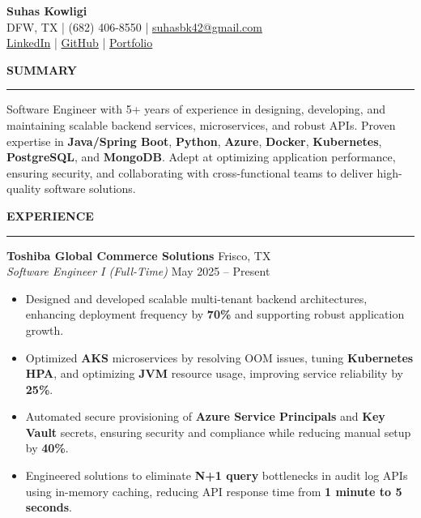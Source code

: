 \documentclass[10pt]{article}
\newcommand{\sectionTitle}[1]{\vspace{1pt}\noindent\textbf{\small #1}\vspace{0.5pt}\hrule\vspace{1pt}}
\begin{document}
\small

\begin{center}
    {\large \textbf{Suhas Kowligi}}\\
    DFW, TX \;|\; (682) 406-8550 \;|\; \href{mailto:suhasbk42@gmail.com}{suhasbk42@gmail.com}\\
    \href{https://www.linkedin.com/in/suhas-kowligi-b39a9415a}{LinkedIn} \;|\;
    \href{https://github.com/SuhasBk}{GitHub} \;|\;
    \href{https://suhasbk.github.io}{Portfolio}
\end{center}

\sectionTitle{SUMMARY}

Software Engineer with 5+ years of experience in designing, developing, and maintaining scalable backend services, microservices, and robust APIs. Proven expertise in \textbf{Java/Spring Boot}, \textbf{Python}, \textbf{Azure}, \textbf{Docker}, \textbf{Kubernetes}, \textbf{PostgreSQL}, and \textbf{MongoDB}. Adept at optimizing application performance, ensuring security, and collaborating with cross-functional teams to deliver high-quality software solutions.

\sectionTitle{EXPERIENCE}

\textbf{Toshiba Global Commerce Solutions} \hfill Frisco, TX \\
\textit{Software Engineer I (Full-Time)} \hfill May 2025 -- Present
\begin{itemize}
    \item Designed and developed scalable multi-tenant backend architectures, enhancing deployment frequency by \textbf{70\%} and supporting robust application growth.
    \item Optimized \textbf{AKS} microservices by resolving OOM issues, tuning \textbf{Kubernetes HPA}, and optimizing \textbf{JVM} resource usage, improving service reliability by \textbf{25\%}.
    \item Automated secure provisioning of \textbf{Azure Service Principals} and \textbf{Key Vault} secrets, ensuring security and compliance while reducing manual setup by \textbf{40\%}.
    \item Engineered solutions to eliminate \textbf{N+1 query} bottlenecks in audit log APIs using in-memory caching, reducing API response time from \textbf{1 minute to 5 seconds}.
\end{itemize}
\end{document}
